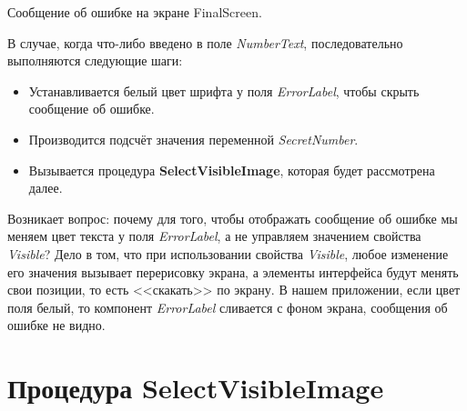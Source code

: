 \begin{enumerate}
\begin{marginfigure}[2em]
      \caption[Сообщение об ошибке на экране FinalScreen.]{Сообщение об ошибке на экране FinalScreen.}
    \label{fig:display:error}
  \end{marginfigure}
  В случае, когда что-либо введено в поле \textit{NumberText}, последовательно выполняются следующие шаги:
  \begin{itemize}
    \item Устанавливается белый цвет шрифта у поля \textit{ErrorLabel}, чтобы скрыть сообщение об ошибке.
    \item Производится подсчёт значения переменной \textit{SecretNumber}.
    \item Вызывается процедура \textbf{SelectVisibleImage}, которая будет рассмотрена далее.
  \end{itemize}
\end{enumerate}
Возникает вопрос: почему для того, чтобы отображать сообщение об ошибке мы меняем цвет текста у поля \textit{ErrorLabel}, а не управляем значением свойства \textit{Visible}? 
Дело в том, что при использовании свойства \textit{Visible}, любое изменение его значения вызывает перерисовку экрана, а элементы интерфейса будут менять свои позиции, то есть <<скакать>> по экрану.
В нашем приложении, если цвет поля белый, то компонент \textit{ErrorLabel} сливается с фоном экрана, сообщения об ошибке не видно.
\section{Процедура SelectVisibleImage}

